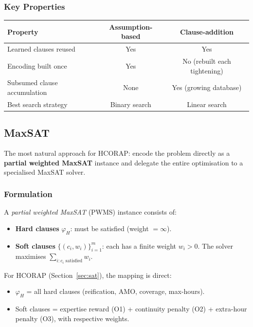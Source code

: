 \documentclass[11pt,a4paper]{article}
\begin{document}
\subsubsection{Key Properties}

\begin{center}
\begin{tabular}{lcc}
\toprule
\textbf{Property} & \textbf{Assumption-based} & \textbf{Clause-addition} \\
\midrule
Learned clauses reused     & Yes  & Yes \\
Encoding built once        & Yes  & No (rebuilt each tightening)\\
Subsumed clause accumulation & None & Yes (growing database) \\
Best search strategy       & Binary search & Linear search \\
\bottomrule
\end{tabular}
\end{center}


\subsection{MaxSAT}\label{sec:opt-maxsat}

The most natural approach for HCORAP: encode the problem directly as a
\textbf{partial weighted MaxSAT} instance and delegate the entire optimisation
to a specialised MaxSAT solver.

\subsubsection{Formulation}

A \emph{partial weighted MaxSAT} (PWMS) instance consists of:
\begin{itemize}
    \item \textbf{Hard clauses} $\varphi_H$: must be satisfied (weight $= \infty$).
    \item \textbf{Soft clauses} $\{(c_i, w_i)\}_{i=1}^{m}$: each has a finite
          weight $w_i > 0$.  The solver maximises
          $\sum_{i : c_i \text{ satisfied}} w_i$.
\end{itemize}

For HCORAP (Section~\ref{sec:sat}), the mapping is direct:
\begin{itemize}
    \item $\varphi_H$ = all hard clauses (reification, AMO, coverage,
          max-hours).
    \item Soft clauses = expertise reward (O1) + continuity penalty (O2) +
          extra-hour penalty (O3), with respective weights.
\end{itemize}
\end{document}

